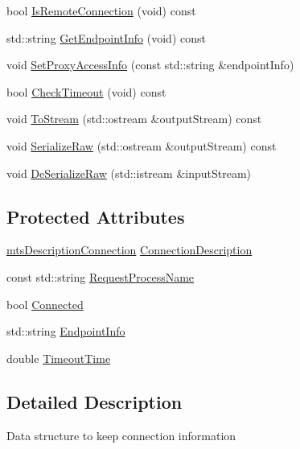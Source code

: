 \begin{DoxyCompactItemize}
bool \hyperlink{classmts_connection_ac1299d1d2ab8168b017950fc372268f4}{Is\+Remote\+Connection} (void) const 
\item 
std\+::string \hyperlink{classmts_connection_a995804182172f108d74d7921e8335884}{Get\+Endpoint\+Info} (void) const 
\item 
void \hyperlink{classmts_connection_ae3cb5e96eb3b93919f1a43d3f4ec19be}{Set\+Proxy\+Access\+Info} (const std\+::string \&endpoint\+Info)
\item 
bool \hyperlink{classmts_connection_a60f579a4b4c6b4e08497b48ed4ef41a4}{Check\+Timeout} (void) const 
\item 
void \hyperlink{classmts_connection_ac622a2e9885cfbbc588f9a08a0849f38}{To\+Stream} (std\+::ostream \&output\+Stream) const 
\item 
void \hyperlink{classmts_connection_a2a29a2b202174b39c7b0f93d18791fb5}{Serialize\+Raw} (std\+::ostream \&output\+Stream) const 
\item 
void \hyperlink{classmts_connection_a893608b72a416d37013db5d036482100}{De\+Serialize\+Raw} (std\+::istream \&input\+Stream)
\end{DoxyCompactItemize}
\subsection*{Protected Attributes}
\begin{DoxyCompactItemize}
\item 
\hyperlink{classmts_description_connection}{mts\+Description\+Connection} \hyperlink{classmts_connection_a0a529fcb9c6627e79c49eb05265dd43e}{Connection\+Description}
\item 
const std\+::string \hyperlink{classmts_connection_a81c4b5147db8f46d70b30c7fabbc72c8}{Request\+Process\+Name}
\item 
bool \hyperlink{classmts_connection_a2384cf6081cf01b9330bf6810108c2b5}{Connected}
\item 
std\+::string \hyperlink{classmts_connection_ad5e701a7d4fe0a27b084d0f8d161c7d6}{Endpoint\+Info}
\item 
double \hyperlink{classmts_connection_a6c190911c627762bcdc0a2145a6739c8}{Timeout\+Time}
\end{DoxyCompactItemize}


\subsection{Detailed Description}
Data structure to keep connection information 

